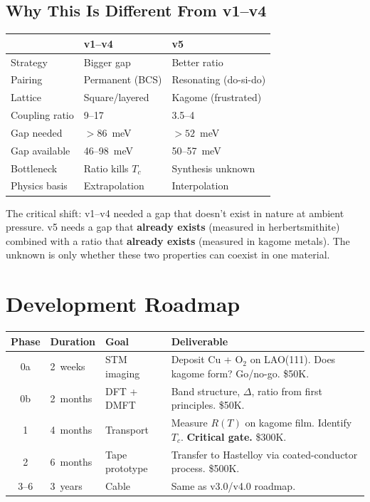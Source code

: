 \documentclass[11pt, a4paper]{article}
\begin{document}
\subsection{Why This Is Different From v1--v4}

\begin{center}
\begin{tabular}{@{}lll@{}}
\toprule
& \textbf{v1--v4} & \textbf{v5} \\
\midrule
Strategy & Bigger gap & Better ratio \\
Pairing & Permanent (BCS) & Resonating (do-si-do) \\
Lattice & Square/layered & Kagome (frustrated) \\
Coupling ratio & 9--17 & 3.5--4 \\
Gap needed & $> 86$~meV & $> 52$~meV \\
Gap available & 46--98~meV & 50--57~meV \\
Bottleneck & Ratio kills $T_c$ & Synthesis unknown \\
Physics basis & Extrapolation & Interpolation \\
\bottomrule
\end{tabular}
\end{center}

The critical shift: v1--v4 needed a gap that doesn't exist in
nature at ambient pressure. v5 needs a gap that \textbf{already
exists} (measured in herbertsmithite) combined with a ratio that
\textbf{already exists} (measured in kagome metals). The unknown
is only whether these two properties can coexist in one material.

\section{Development Roadmap}

\begin{center}
\begin{tabular}{@{}clp{3.5cm}p{4.5cm}@{}}
\toprule
\textbf{Phase} & \textbf{Duration} & \textbf{Goal} &
  \textbf{Deliverable} \\
\midrule
0a & 2~weeks & STM imaging & Deposit Cu + O$_2$ on LAO(111).
     Does kagome form? Go/no-go. \$50K. \\
0b & 2~months & DFT + DMFT & Band structure, $\Delta$, ratio
     from first principles. \$50K. \\
1 & 4~months & Transport & Measure $R(T)$ on kagome film.
     Identify $T_c$. \textbf{Critical gate.} \$300K. \\
2 & 6~months & Tape prototype & Transfer to Hastelloy via
     coated-conductor process. \$500K. \\
3--6 & 3~years & Cable & Same as v3.0/v4.0 roadmap. \\
\bottomrule
\end{tabular}
\end{center}
\end{document}
